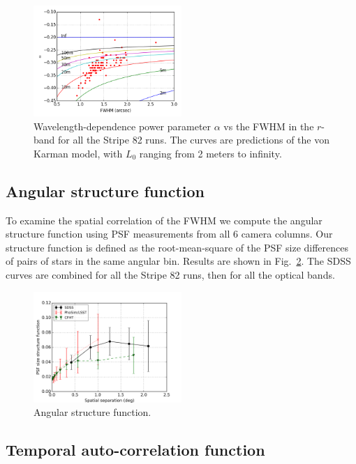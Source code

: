 \begin{figure}
\centering
\includegraphics[width=0.5\textwidth]{FIGURES/alpha_fwhm.png}
\caption{Wavelength-dependence power parameter $\alpha$ vs the
  FWHM in the $r$-band for all the Stripe 82 runs. 
The curves are predictions of the von Karman
  model, with $L_0$ ranging from 2 meters to infinity.
\label{fig:alpha_fwhm}}
\end{figure}



\subsection{Angular structure function} 

To examine the spatial correlation of the FWHM we compute the angular
structure function using PSF measurements from all 6 camera columns.
Our structure function is defined as
the root-mean-square of the PSF size differences of pairs of stars
in the same angular bin. 
Results are shown in Fig.~\ref{fig:spatial}.
The SDSS curves are combined for all the Stripe 82 runs, then for all
the optical bands.

\begin{figure}
\centering
\includegraphics[width=0.5\textwidth]{FIGURES/spatial.png}
\caption{Angular structure function. 
\label{fig:spatial}}
\end{figure}


\subsection{Temporal auto-correlation function}

